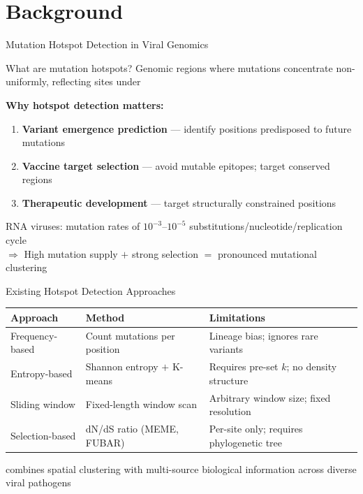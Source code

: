 \section{Background}

\begin{frame}{Mutation Hotspot Detection in Viral Genomics}
  \begin{block}{What are mutation hotspots?}
    Genomic regions where mutations concentrate non-uniformly, reflecting sites under 
  \end{block}
  \vspace{0.5em}

  \textbf{Why hotspot detection matters:}
  \begin{enumerate}
    \item \textbf{Variant emergence prediction} --- identify positions predisposed to future mutations
    \item \textbf{Vaccine target selection} --- avoid mutable epitopes; target conserved regions
    \item \textbf{Therapeutic development} --- target structurally constrained positions
  \end{enumerate}
  \vspace{0.5em}

  RNA viruses: mutation rates of $10^{-3}$--$10^{-5}$ substitutions/nucleotide/replication cycle\\
  $\Rightarrow$ High mutation supply $+$ strong selection $=$ pronounced mutational clustering
\end{frame}

\begin{frame}{Existing Hotspot Detection Approaches}
  \scriptsize
  \begin{tabular}{p{2.8cm}p{4.5cm}p{4.5cm}}
    \toprule
    \textbf{Approach} & \textbf{Method} & \textbf{Limitations} \\
    \midrule
    Frequency-based & Count mutations per position & Lineage bias; ignores rare variants \\[0.3em]
    Entropy-based & Shannon entropy $+$ K-means & Requires pre-set $k$; no density structure \\[0.3em]
    Sliding window & Fixed-length window scan & Arbitrary window size; fixed resolution \\[0.3em]
    Selection-based & dN/dS ratio (MEME, FUBAR) & Per-site only; requires phylogenetic tree \\
    \bottomrule
  \end{tabular}
  \vspace{0.5em}

   combines spatial clustering with multi-source biological information across diverse viral pathogens
\end{frame}

